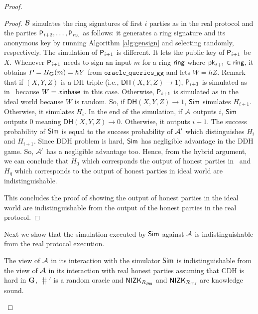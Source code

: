 \begin{proof}
\begin{proof}
			$\mathcal{B} $ simulates the ring signatures of first $ i $ parties as in the real protocol and the parties $ \mathsf{P}_{i+2}, \ldots, \mathsf{P}_{n_h} $ as follows: it generates a ring signature and its anonymous key by running Algorithm \ref{alg:gensign} and selecting randomly, respectively. The simulation of $ \mathsf{P}_{i + 1} $ is different. It lets the public key of $ \mathsf{P}_{i + 1} $ be $ X$. Whenever $ \mathsf{P}_{i+1} $ needs to sign an input $ m$ for a ring $ \mathsf{ring} $ where $ \mathsf{pk}_{i+1} \in \mathsf{ring}$, it obtains $ P = H_{\mathbf{G}}(m) = hY $ from $ \mathtt{oracle\_queries\_gg} $ and lets $ W = hZ $. Remark that if $ (X,Y,Z)$ is a DH triple (i.e., $  \mathsf{DH}(X,Y,Z) \rightarrow 1 $), $ \mathsf{P}_{i+1} $ is simulated as in \name \ because $ W = x{\mathsf{inbase}}$ in this case. Otherwise, $ \mathsf{P}_{i+1} $ is simulated as in the ideal world because $ W $ is random. So, if $  \mathsf{DH}(X,Y,Z)  \rightarrow 1$, $\mathsf{Sim} $ simulates $ H_{i+1} $. Otherwise, it simulates $ H_{i} $. In the end of the simulation, if $ \mathcal{A} $ outputs $ i $, $\mathsf{Sim} $ outputs $ 0 $ meaning $  \mathsf{DH}(X,Y,Z) \rightarrow 0$. Otherwise, it outputs $ i + 1 $. The success probability of $\mathsf{Sim} $ is equal to the success probability of $ \mathcal{A}' $ which distinguishes $ H_i $ and $ H_{i +1} $. Since DDH problem is hard, $\mathsf{Sim} $ has negligible advantage in the DDH game. So, $ \mathcal{A}' $ has a negligible advantage too. Hence, from the hybrid argument, we can conclude that $ H_0    $ which corresponds the output of honest parties in  \name\ and $ H_q  $ which corresponds to  the output of honest parties in ideal world are indistinguishable.
			
			This concludes the proof of showing the output of honest parties in the ideal world are indistinguishable from the output of the honest parties in the real protocol.
		\end{proof}	
		
		Next we show that the simulation executed by $ \mathsf{Sim} $ against $ \mathcal{A} $ is indistinguishable from the real protocol execution.
		
		\begin{lemma} 
			The view of $ \mathcal{A} $ in its interaction with the simulator $ \mathsf{Sim} $ is indistinguishable from the view of $ \mathcal{A} $ in its interaction with real honest parties assuming that CDH is hard in $ {\mathbf{G}} $, $ \hash' $ is a random oracle and $ {\mathsf{NIZK}}_{R_{\mathsf{dleq}}} $ and $ {\mathsf{NIZK}}_{\mathcal{R}_{\mathsf{ring}}} $ are knowledge sound.
		\end{lemma}
		

\end{proof}
